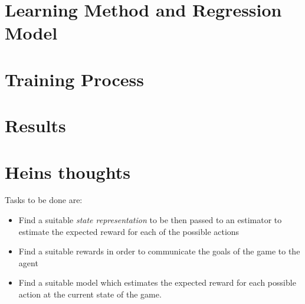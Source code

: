 \documentclass[12pt]{report}
\begin{document}

\tableofcontents
\pagebreak

\renewcommand{\thesection}{\arabic{section}}

\section{Learning Method and Regression Model}

	
\section{Training Process}


\section{Results}



\section{Heins thoughts}
Tasks to be done are:
	\begin{itemize}
		\item Find a suitable \textit{state representation} to be then passed to an estimator to estimate the expected reward for each of the possible actions
		\item Find a suitable rewards in order to communicate the goals of the game to the agent
		\item Find a suitable model which estimates the expected reward for each possible action at the current state of the game.
	\end{itemize}
\end{document}
